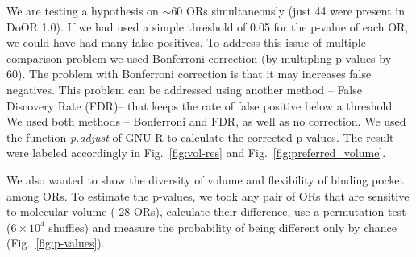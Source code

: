 \documentclass[fleqn,10pt]{wlscirep} %
\newcommand{\numberofreceptors}{ 28 }
\begin{document}
We are testing a hypothesis on $\sim$60 ORs simultaneously (just 44 were present in DoOR 1.0). 
If we had used a simple threshold of 0.05 for the p-value of each OR, we could have had many false positives. 
To address this issue of multiple-comparison problem 
we used Bonferroni correction (by multipling p-values by 60). 
The problem with Bonferroni correction is that it may increases false negatives.
This problem can be addressed using another method -- False Discovery Rate (FDR)--  that keeps the rate of false positive below a threshold \cite{benjamini1995controlling,shaffer1995multiple}.
We used both methods -- Bonferroni and FDR, as well as no correction. We used the function \textit{p.adjust} of GNU R to calculate the corrected p-values. 
The result were labeled accordingly in Fig.~\ref{fig:vol-res} and Fig.~\ref{fig:preferred_volume}.

We also wanted to show the diversity of volume and flexibility of binding pocket among ORs.
To estimate the p-values, 
we took any pair of ORs that are sensitive to molecular volume (\numberofreceptors ORs),
calculate their difference, 
use a permutation test ($6\times10^4$ shuffles) and measure the probability of being different only by chance (Fig.~\ref{fig:p-values}).

\end{document}
